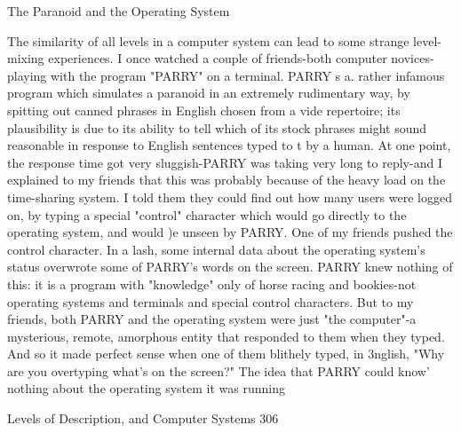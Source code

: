                                The Paranoid and the Operating System

       The similarity of all levels in a computer system can lead to some strange level-
       mixing experiences. I once watched a couple of friends-both computer novices-
       playing with the program "PARRY" on a terminal. PARRY s a. rather infamous
       program which simulates a paranoid in an extremely rudimentary way, by spitting
       out canned phrases in English chosen from a vide repertoire; its plausibility is due
       to its ability to tell which of its stock phrases might sound reasonable in response
       to English sentences typed to t by a human.
                At one point, the response time got very sluggish-PARRY was taking very
       long to reply-and I explained to my friends that this was probably because of the
       heavy load on the time-sharing system. I told them they could find out how many
       users were logged on, by typing a special "control" character which would go
       directly to the operating system, and would )e unseen by PARRY. One of my
       friends pushed the control character. In a lash, some internal data about the
       operating system's status overwrote some of PARRY's words on the screen.
       PARRY knew nothing of this: it is a program with "knowledge" only of horse
       racing and bookies-not operating systems and terminals and special control
       characters. But to my friends, both PARRY and the operating system were just
       "the computer"-a mysterious, remote, amorphous entity that responded to them
       when they typed. And so it made perfect sense when one of them blithely typed,
       in 3nglish, "Why are you overtyping what's on the screen?" The idea that PARRY
       could know' nothing about the operating system it was running



Levels of Description, and Computer Systems                                            306

